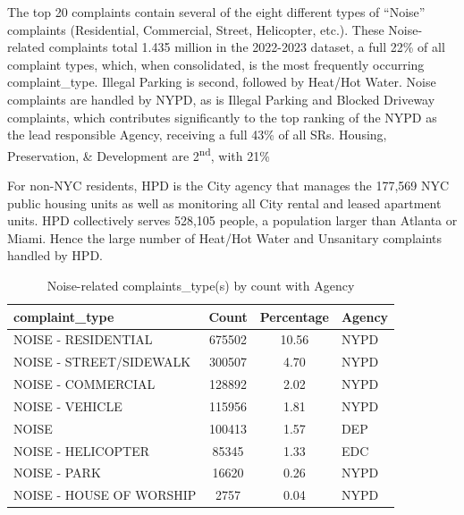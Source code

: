 \documentclass[12pt, titlepage]{article}
\begin{document}
The top 20 complaints contain several of the eight different types of ``Noise'' 
complaints (Residential, Commercial, Street, Helicopter, etc.). These Noise-related
complaints total 1.435 million in the 2022-2023 dataset, a full 22\% of 
all complaint types, which, when consolidated, is the most frequently occurring complaint\_type.
Illegal Parking is second, followed by Heat/Hot Water. Noise complaints 
are handled by NYPD, as is Illegal Parking and Blocked Driveway complaints, 
which contributes significantly to the top ranking of the NYPD as the lead 
responsible Agency, receiving a full 43\% of all SRs. 
Housing, Preservation, \& Development are 2\textsuperscript{nd}, with 21\%

For  non-NYC residents, HPD is the City agency that manages the 
177,569 NYC public housing units as well as monitoring
all City rental and leased apartment units. HPD collectively serves 
528,105 people, a population larger than Atlanta or Miami. 
Hence the large number of Heat/Hot Water and Unsanitary complaints 
handled by HPD. 




\begin{table}[tbp]
    \centering
    \normalsize
    \caption{Noise-related complaints\_type(s) by count with Agency}
    \begin{tabular}{@{}lS[table-format=7.0,round-mode=places,
    round-precision=0]S[table-format=2.2,round-mode=places,
    round-precision=2]l@{}} %
        \toprule
        \textbf{complaint\_type} & \textbf{Count} & \textbf{Percentage} & \textbf{Agency} \\ 
        \midrule
        NOISE - RESIDENTIAL        & 675502 & 10.56 & NYPD  \\ 
        NOISE - STREET/SIDEWALK    & 300507 &  4.70 & NYPD  \\ 
        NOISE - COMMERCIAL         & 128892 &  2.02 & NYPD  \\ 
        NOISE - VEHICLE            & 115956 &  1.81 & NYPD  \\ 
        NOISE                      & 100413 &  1.57 & DEP   \\ 
        NOISE - HELICOPTER         &  85345 &  1.33 & EDC   \\ 
        NOISE - PARK               &  16620 &  0.26 & NYPD  \\ 
        NOISE - HOUSE OF WORSHIP   &   2757 &  0.04 & NYPD  \\ 
        \bottomrule
    \end{tabular}
    \label{tab:noisecomplaints}
\end{table}
\end{document}
